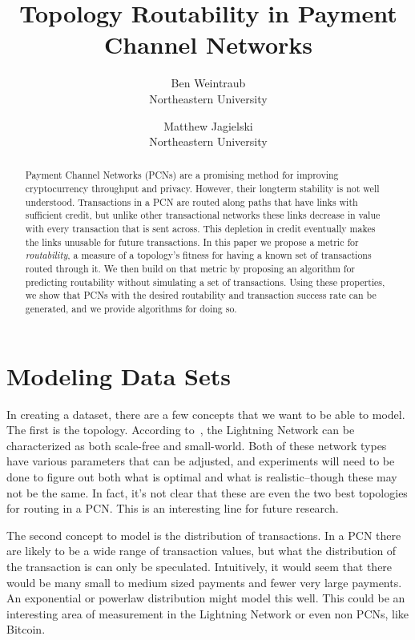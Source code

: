 \documentclass{article}
\theoremstyle{definition}
\begin{document}
\title{Topology Routability in Payment Channel Networks}

\author{
  {\rm Ben Weintraub}\\
  Northeastern University
  \and
  {\rm Matthew Jagielski}\\
  Northeastern University
}
\maketitle

\begin{abstract}
  Payment Channel Networks (PCNs) are a promising method for improving cryptocurrency throughput and privacy. However, their longterm stability is not well understood. Transactions in a PCN are routed along paths that have links with sufficient credit, but unlike other transactional networks these links decrease in value with every transaction that is sent across. This depletion in credit eventually makes the links unusable for future transactions. In this paper we propose a metric for \emph{routability}, a measure of a topology's fitness for having a known set of transactions routed through it. We then build on that metric by proposing an algorithm for predicting routability without simulating a set of transactions. Using these properties, we show that PCNs with the desired routability and transaction success rate can be generated, and we provide algorithms for doing so.
\end{abstract}

\section{Modeling Data Sets}
In creating a dataset, there are a few concepts that we want to be able to model. The first is the topology. According to~\cite{rohrer2019discharged}, the Lightning Network can be characterized as both scale-free and small-world. Both of these network types have various parameters that can be adjusted, and experiments will need to be done to figure out both what is optimal and what is realistic--though these may not be the same. In fact, it's not clear that these are even the two best topologies for routing in a PCN. This is an interesting line for future research.

The second concept to model is the distribution of transactions. In a PCN there are likely to be a wide range of transaction values, but what the distribution of the transaction is can only be speculated. Intuitively, it would seem that there would be many small to medium sized payments and fewer very large payments. An exponential or powerlaw distribution might model this well. This could be an interesting area of measurement in the Lightning Network or even non PCNs, like Bitcoin.
\end{document}
